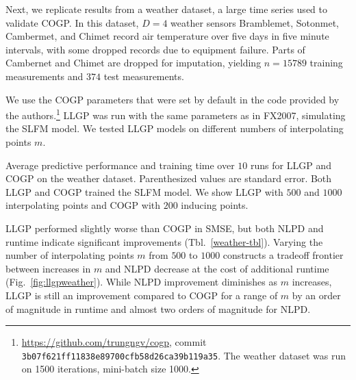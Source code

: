 \documentclass{article}
\begin{document}
Next, we replicate results from a weather dataset, a large time series used to validate COGP. In this dataset, $D=4$ weather sensors Bramblemet, Sotonmet, Cambermet, and Chimet record air temperature over five days in five minute intervals, with some dropped records due to equipment failure. Parts of Cambernet and Chimet are dropped for imputation, yielding $n=15789$ training measurements and $374$ test measurements. 

We use the COGP parameters that were set by default in the code provided by the authors.\footnote{\url{https://github.com/trungngv/cogp}, commit \texttt{3b07f621ff11838e89700cfb58d26ca39b119a35}. The weather dataset was run on 1500 iterations, mini-batch size 1000.} LLGP was run with the same parameters as in FX2007, simulating the SLFM model. We tested LLGP models on different numbers of interpolating points $m$.

\begin{table}[!ht]
  \caption{Average predictive performance and training time over $10$ runs for LLGP and COGP on the weather dataset. Parenthesized values are standard error. Both LLGP and COGP trained the SLFM model. We show LLGP with $500$ and $1000$ interpolating points and COGP with $200$ inducing points.}
\label{weather-tbl}
\vskip 0.15in
\begin{center}
  \begin{small}
    \begin{sc}
      
\end{sc}
\end{small}
\end{center}
\vskip -0.1in
\end{table}

LLGP performed slightly worse than COGP in SMSE, but both NLPD and runtime indicate significant improvements (Tbl.~\ref{weather-tbl}). Varying the number of interpolating points $m$ from $500$ to $1000$ constructs a tradeoff frontier between increases in $m$ and NLPD decrease at the cost of additional runtime (Fig.~\ref{fig:llgpweather}). While NLPD improvement diminishes as $m$ increases, LLGP is still an improvement compared to COGP for a range of $m$ by an order of magnitude in runtime and almost two orders of magnitude for NLPD.
\end{document}
